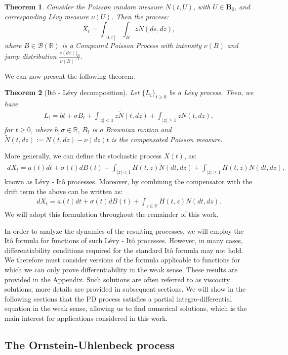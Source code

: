 \documentclass[11pt,reqno]{article}
\newtheorem{theorem}{Theorem}[section]
\theoremstyle{definition}
\begin{document}
\begin{theorem}
	Consider the Poisson random measure  $N(t,U)$, with $U \in \textbf{B}_0$, and corresponding L\'evy measure $\nu(U)$. Then the process:
	$$ X_t = \int_{[0,t]} \int_{B} z N(ds,dz), $$
	where $B \in \mathcal{B}(\mathbb{R})$ is a Compound Poisson Process with intensity $\nu(B)$ and jump distribution $\frac{\nu(dx)|_B}{\nu(B)^{-1}}$.
\end{theorem}
We can now present the following theorem:
\begin{theorem}[It\^o - L\'evy decomposition]
	Let $\{L_t\}_{t \geq 0}$ be a L\'evy process. Then, we have 
	\begin{eqnarray}
		L_t = bt + \sigma B_t + \int_{|z|<1} z \tilde{N}(t,dz) + \int_{|z| \geq1} z N(t,dz), 
	\end{eqnarray}
	for $ t \geq 0 $, where $b, \sigma \in \mathbb{R}$, $B_t$ is a Brownian motion and $\tilde{N}(t,dz):=N(t,dz)- \nu(dz)t$ is the compensated Poisson measure. 	
\end{theorem}
More generally, we can define the stochastic process $ X(t)$, as: 
\begin{eqnarray}
	dX_t=a(t)dt + \sigma(t)dB(t) + \int_{|z|<1} H(t,z) \tilde{N}(dt,dz) + \int_{|z| \geq1} H(t,z) N(dt,dz),
\end{eqnarray}
known as L\'evy - It\^o processes. Moreover, by combining the compensator with the drift term the above can be written as: 
\begin{eqnarray}
	dX_t=a(t)dt + \sigma(t)dB(t) + \int_{z \in \mathbb{R}} H(t,z) N(dt,dz).
\end{eqnarray}
We will adopt this formulation throughout the remainder of this work.

In order to analyze the dynamics of the resulting processes, we will employ the It\^o formula for functions of such L\'evy - It\^o processes. However, in many cases, differentiability conditions required for the standard It\^o formula may not hold. We therefore must consider versions of the formula applicable to functions for which we can only prove differentiability in the weak sense. These results are provided in the Appendix. Such solutions are often referred to as viscocity solutions; more details are provided in subsequent sections. We will show in the following sections that the PD process satisfies a partial integro-differential equation in the weak sense, allowing us to find numerical solutions, which is the main interest for applications considered in this work. 

\subsection{The Ornstein-Uhlenbeck process}
\end{document}
